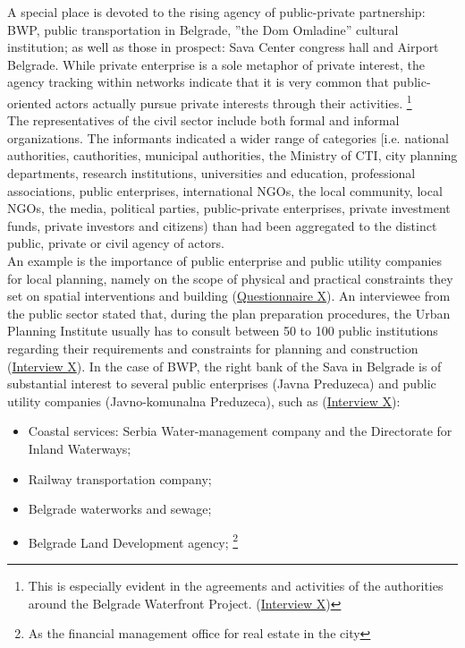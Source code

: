 \documentclass[11pt]{report}
\begin{document}
{{{{A special place is devoted to the rising agency of public-private partnership: BWP, public transportation in Belgrade, ”the Dom Omladine” cultural institution; as well as those in prospect: Sava Center congress hall and Airport Belgrade. While private enterprise is a sole metaphor of private interest, the agency tracking within networks indicate that it is very common that public-oriented actors actually pursue private interests through their activities.
\footnote{This is especially evident in the agreements and activities of the authorities around the Belgrade Waterfront Project. (\href{InterviewX}{Interview X})}
\\

The representatives of the civil sector include both formal and informal organizations. The informants indicated a wider range of categories [i.e. national authorities, cauthorities, municipal authorities, the Ministry of CTI, city planning departments, research institutions, universities and education, professional associations, public enterprises, international NGOs, the local community, local NGOs, the media, political parties, public-private enterprises, private investment funds, private investors and citizens) than had been aggregated to the distinct public, private or civil agency of actors.
\\

An example is the importance of public enterprise and public utility companies for local planning, namely on the scope of physical and practical constraints they set on spatial interventions and building (\href{Questionnaire Experts Post-socialist}{Questionnaire X}).
An interviewee from the public sector stated that, during the plan preparation procedures, the Urban Planning Institute usually has to consult between 50 to 100 public institutions regarding their requirements and constraints for planning and construction (\href{InterviewX}{Interview X}).
In the case of BWP, the right bank of the Sava in Belgrade is of substantial interest to several public enterprises (Javna Preduzeca) and public utility companies (Javno-komunalna Preduzeca), such as (\href{InterviewX}{Interview X}):

\begin{itemize}
\item Coastal services: Serbia Water-management company and the Directorate for Inland Waterways;
\item Railway transportation company;
\item Belgrade waterworks and sewage;
\item Belgrade Land Development agency;
\footnote{As the financial management office for real estate in the city}
\end{itemize}

}}}}
\end{document}
